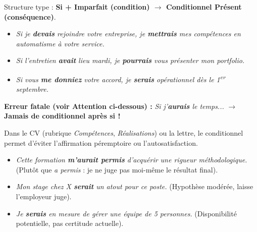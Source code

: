 \documentclass[11pt]{article}
\begin{document}
\begin{exemplebox}
Structure type : \textbf{Si + Imparfait (condition) $\rightarrow$ Conditionnel Présent (conséquence)}.
\begin{itemize}
    \item \emph{Si je \textbf{devais} rejoindre votre entreprise, je \textbf{mettrais} mes compétences en automatisme à votre service.}
    \item \emph{Si l'entretien \textbf{avait} lieu mardi, je \textbf{pourrais} vous présenter mon portfolio.}
    \item \emph{Si vous \textbf{me donniez} votre accord, je \textbf{serais} opérationnel dès le 1\textsuperscript{er} septembre.}
\end{itemize}
\textbf{Erreur fatale (voir \textbf{Attention} ci-dessous) :} \emph{Si j'\textbf{aurais} le temps...} $\rightarrow$ \textbf{Jamais de conditionnel après \textbf{si} !}
\end{exemplebox}

\begin{exemplebox}
Dans le CV (rubrique \emph{Compétences}, \emph{Réalisations}) ou la lettre, le conditionnel permet d'éviter l'affirmation péremptoire ou l'autosatisfaction.
\begin{itemize}
    \item \emph{Cette formation \textbf{m'aurait permis} d'acquérir une rigueur méthodologique.} (Plutôt que \emph{a permis} : je ne juge pas moi-même le résultat final).
    \item \emph{Mon stage chez X \textbf{serait} un atout pour ce poste.} (Hypothèse modérée, laisse l'employeur juge).
    \item \emph{Je \textbf{serais} en mesure de gérer une équipe de 5 personnes.} (Disponibilité potentielle, pas certitude actuelle).
\end{itemize}
\end{exemplebox}
\end{document}
